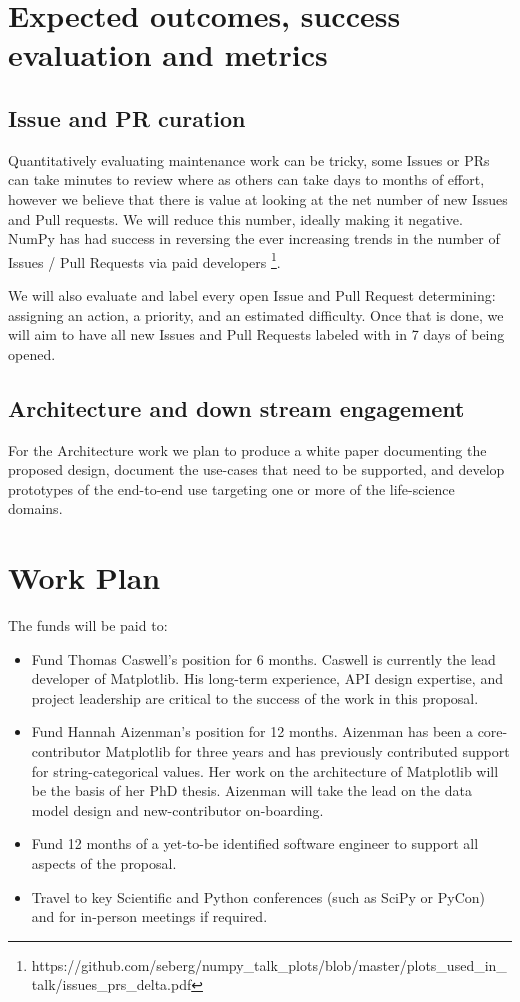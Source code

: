 \documentclass[11pt]{article}  %
\begin{document}
\section{Expected outcomes, success evaluation and metrics}
\subsection{Issue and PR curation}

Quantitatively evaluating maintenance work can be tricky, some Issues
or PRs can take minutes to review where as others can take days to
months of effort, however we believe that there is value at looking at
the net number of new Issues and Pull requests.  We will reduce this
number, ideally making it negative.  NumPy has had success in
reversing the ever increasing trends in the number of Issues / Pull
Requests via paid
developers \footnote{https://github.com/seberg/numpy\_talk\_plots/blob/master/plots\_used\_in\_talk/issues\_prs\_delta.pdf}.


We will also evaluate and label every open Issue and Pull Request
determining: assigning an action, a priority, and an estimated
difficulty.  Once that is done, we will aim to have all new Issues and
Pull Requests labeled with in 7 days of being opened.


\subsection{Architecture and down stream engagement}

For the Architecture work we plan to produce a white paper documenting
the proposed design, document the use-cases that need to be supported,
and develop prototypes of the end-to-end use targeting one or more of the
life-science domains.


\section{Work Plan}

The funds will be paid to:

\begin{itemize}

\item Fund Thomas Caswell's position for 6 months.  Caswell is
  currently the lead developer of Matplotlib.  His long-term
  experience, API design expertise, and project leadership are critical
  to the success of the work in this proposal.
\item Fund Hannah Aizenman's position for 12 months.  Aizenman has
  been a core-contributor Matplotlib for three years and has
  previously contributed support for string-categorical values.  Her
  work on the architecture of Matplotlib will be the basis of her PhD
  thesis.  Aizenman will take the lead on the data model design and
  new-contributor on-boarding.
\item Fund 12 months of a yet-to-be identified software engineer to
  support all aspects of the proposal.
\item Travel to key Scientific and Python conferences (such as SciPy
  or PyCon) and for in-person meetings if required.
\end{itemize}
\end{document}
